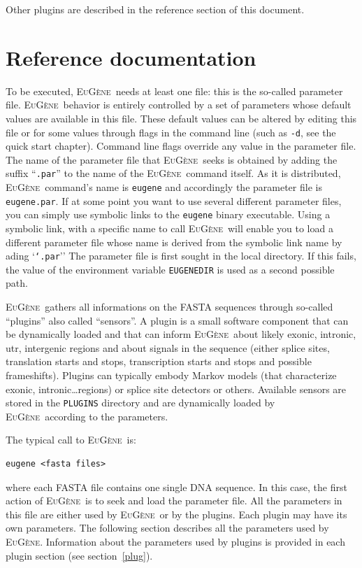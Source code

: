 \documentclass[a4paper,titlepage]{report}
\newcommand{\EuGene}{\textsc{EuG\`ene}}
\begin{document}
Other plugins are described in the reference section of this document.

\newpage
\chapter{Reference documentation}

To be executed, \EuGene\ needs at least one file: this is the
so-called parameter file.  \EuGene\ behavior is entirely controlled
by a set of parameters whose default values are available in this
file. These default values can be altered by editing this file or for
some values through flags in the command line (such as \texttt{-d},
see the quick start chapter). Command line flags override any value in the parameter
file. The name of the parameter file that \EuGene\ seeks is obtained
by adding the suffix ``\texttt{.par}'' to the name of the \EuGene\ 
command itself.  As it is distributed, \EuGene\ command's name is
\texttt{eugene} and accordingly the parameter file is
\texttt{eugene.par}. If at some point you want to use several
different parameter files, you can simply use symbolic links to the
\texttt{eugene} binary executable. Using a symbolic link, with a
specific name to call \EuGene\ will enable you to load a different
parameter file whose name is derived from the symbolic link name by
ading `\texttt{`.par}'' The parameter file is first sought in the
local directory.  If this fails, the value of the environment variable
\texttt{EUGENEDIR} is used as a second possible path.

\EuGene\ gathers all informations on the FASTA sequences through
so-called ``plugins'' also called ``sensors''. A plugin is a small
software component that can be dynamically loaded and that can inform
\EuGene\ about likely exonic, intronic, utr, intergenic regions and
about signals in the sequence (either splice sites, translation starts
and stops, transcription starts and stops and possible frameshifts).
Plugins can typically embody Markov models (that characterize exonic,
intronic\ldots regions) or splice site detectors or others.  Available
sensors are stored in the \texttt{PLUGINS} directory and are
dynamically loaded by \EuGene\ according to the parameters.

The typical call to \EuGene\ is:

\begin{Verbatim}[fontsize=\small]
eugene <fasta files>
\end{Verbatim}

where each FASTA file contains one single DNA sequence. In this case,
the first action of \EuGene\ is to seek and load the parameter file.
All the parameters in this file are either used by \EuGene\ or by the
plugins. Each plugin may have its own parameters. The following
section describes all the parameters used by \EuGene. Information
about the parameters used by plugins is provided in each plugin
section (see section~\ref{plug}).
\end{document}
